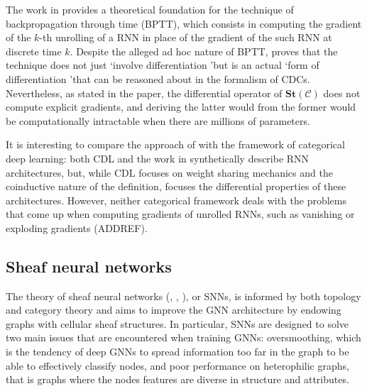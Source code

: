\documentclass[11pt,a4paper,openright,twoside]{report}
\theoremstyle{plain}
\theoremstyle{definition}
\begin{document}
The work in \cite{sprunger2019differentiable} provides a theoretical foundation for the technique of backpropagation through time (BPTT), which consists in computing the gradient of the $k$-th unrolling of a RNN in place of the gradient of the such RNN at discrete time $k$. Despite the alleged ad hoc nature of BPTT, \cite{sprunger2019differentiable} proves that the technique does not just \lq involve differentiation \rq but is an actual \lq form of differentiation \rq that can be reasoned about in the formalism of CDCs. Nevertheless, as stated in the paper, the differential operator of $\mathbf{St}(\mathcal{C})$ does not compute explicit gradients, and deriving the latter would from the former would be computationally intractable when there are millions of parameters. 


It is interesting to compare the approach of \cite{sprunger2019differentiable} with the framework of categorical deep learning: both CDL and the work in \cite{sprunger2019differentiable} synthetically describe RNN architectures, but, while CDL focuses on weight sharing mechanics and the coinductive nature of the definition, \cite{sprunger2019differentiable} focuses the differential properties of these architectures. However, neither categorical framework deals with the problems that come up when computing gradients of unrolled RNNs, such as vanishing or exploding gradients (ADDREF). 


\subsection{Sheaf neural networks}

The theory of sheaf neural networks (\cite{hansen2020sheaf}, \cite{bodnar2022neural}, \cite{zaghen2024nonlinear}), or SNNs, is informed by both topology and category theory and aims to improve the GNN architecture by endowing graphs with cellular sheaf structures. In particular, SNNs are designed to solve two main issues that are encountered when training GNNs: oversmoothing, which is the tendency of deep GNNs to spread information too far in the graph to be able to effectively classify nodes, and poor performance on heterophilic graphs, that is graphs where the nodes features are diverse in structure and attributes.
\end{document}
